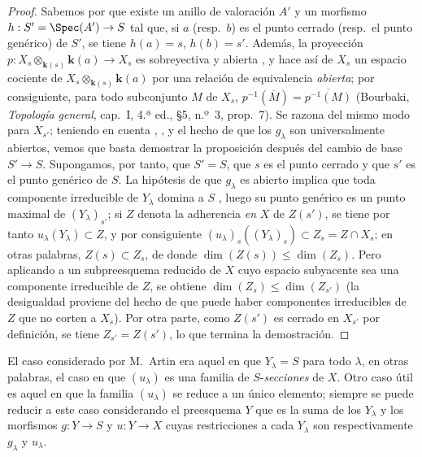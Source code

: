 \begin{proof}
Sabemos por  que existe un anillo de valoración $A'$ y un morfismo $h:S'=\Spec(A')\to S$ tal que, si $a$ (resp.\ $b$) es el punto cerrado (resp.\ el punto genérico) de $S'$, se tiene $h(a)=s$, $h(b)=s'$.
Además, la proyección $p:X_s\otimes_{\mathbf k(s)}\boldsymbol{k}(a)\to X_s$ es sobreyectiva y abierta , y hace así de $X_s$ un espacio cociente de $X_s\otimes_{\mathbf k(s)}\boldsymbol{k}(a)$ por una relación de equivalencia \emph{abierta}; por consiguiente, para todo subconjunto $M$ de $X_s$, $p^{-1}(\overline{M})=\overline{p^{-1}(M)}$ (Bourbaki, \emph{Topología general}, cap.~I, 4.ª ed., \S5, n.º~3, prop.~7).
Se razona del mismo modo para $X_{s'}$; teniendo en cuenta , , y el hecho de que los $g_\lambda$ son universalmente abiertos, vemos que basta demostrar la proposición después del cambio de base $S'\to S$.
Supongamos, por tanto, que $S'=S$, que $s$ es el punto cerrado y que $s'$ es el punto genérico de $S$.
La hipótesis de que $g_\lambda$ es abierto implica que toda componente irreducible de $Y_\lambda$ domina a $S$ , luego su punto genérico es un punto maximal de $(Y_\lambda)_{s'}$; si $Z$ denota la adherencia \emph{en} $X$ de $Z(s')$, se tiene por tanto $u_\lambda(Y_\lambda)\subset Z$, y por consiguiente $(u_\lambda)_s((Y_\lambda)_s)\subset Z_s=Z\cap X_s$; en otras palabras, $Z(s)\subset Z_s$, de donde $\dim(Z(s))\leq\dim(Z_s)$.
Pero aplicando  a un subpreesquema reducido de $X$ cuyo espacio subyacente sea una componente irreducible de $Z$, se obtiene $\dim(Z_s)\leq\dim(Z_{s'})$ (la desigualdad proviene del hecho de que puede haber componentes irreducibles de $Z$ que no corten a $X_s$).
Por otra parte, como $Z(s')$ es cerrado en $X_{s'}$ por definición, se tiene $Z_{s'}=Z(s')$, lo que termina la demostración.
\end{proof}

\begin{remark}[14.3.12]
\label{IV.14.3.12}
El caso considerado por M.\ Artin era aquel en que $Y_\lambda=S$ para todo $\lambda$, en otras palabras, el caso en que $(u_\lambda)$ es una familia de $S$-\emph{secciones} de $X$.
Otro caso útil es aquel en que la familia $(u_\lambda)$ se reduce a un único elemento; siempre se puede reducir a este caso considerando el preesquema $Y$ que es la suma de los $Y_\lambda$ y los morfismos $g:Y\to S$ y $u:Y\to X$ cuyas restricciones a cada $Y_\lambda$ son respectivamente $g_\lambda$ y $u_\lambda$.
\end{remark}

